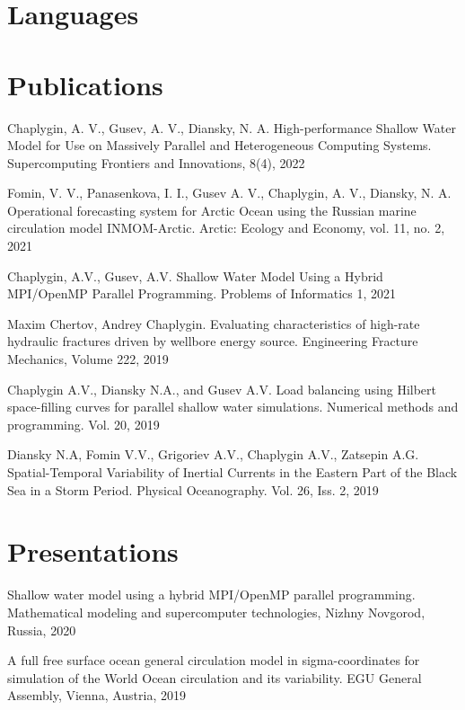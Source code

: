 \documentclass[10pt,a4paper]{moderncv}
\begin{document}
\clearpage

\section{Languages}

\section{Publications}

\cvlistitem
{Chaplygin, A. V., Gusev, A. V., Diansky, N. A. High-performance Shallow Water Model for Use on Massively Parallel and Heterogeneous Computing Systems. Supercomputing Frontiers and Innovations, 8(4), 2022}

\cvlistitem
{Fomin, V. V., Panasenkova, I. I., Gusev A. V., Chaplygin, A. V., Diansky, N. A. Operational forecasting system for Arctic Ocean using the Russian marine circulation model INMOM-Arctic. Arctic: Ecology and Economy, vol. 11, no. 2, 2021}

\cvlistitem
{Chaplygin, A.V., Gusev, A.V. Shallow Water Model Using a Hybrid MPI/OpenMP Parallel Programming. Problems of Informatics 1, 2021}

\cvlistitem
{Maxim Chertov, Andrey Chaplygin. Evaluating characteristics of high-rate hydraulic fractures driven by wellbore energy source. Engineering Fracture Mechanics, Volume 222, 2019}

\cvlistitem
{Chaplygin A.V., Diansky N.A., and Gusev A.V. Load balancing using Hilbert space-filling curves for parallel shallow water simulations. Numerical methods and programming. Vol. 20, 2019}

\cvlistitem
{Diansky N.A, Fomin V.V., Grigoriev A.V., Chaplygin A.V., Zatsepin A.G. Spatial-Temporal Variability of Inertial Currents in the Eastern Part of the Black Sea in a Storm Period. Physical Oceanography. Vol. 26, Iss. 2, 2019}

\section{Presentations}

\cvlistitem
{Shallow water model using a hybrid MPI/OpenMP parallel programming. Mathematical modeling and supercomputer technologies, Nizhny Novgorod, Russia, 2020}

\cvlistitem
{A full free surface ocean general circulation model in sigma-coordinates for simulation of the World Ocean circulation and its variability. EGU General Assembly, Vienna, Austria, 2019} 
\end{document}
